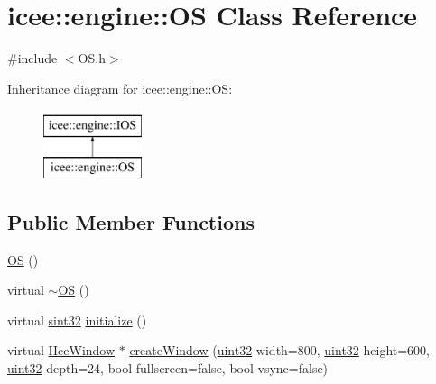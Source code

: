 \hypertarget{classicee_1_1engine_1_1OS}{
\section{icee::engine::OS Class Reference}
\label{classicee_1_1engine_1_1OS}
}


{\ttfamily \#include $<$OS.h$>$}

Inheritance diagram for icee::engine::OS:\begin{figure}[H]
\begin{center}
\leavevmode
\includegraphics[height=2.000000cm]{classicee_1_1engine_1_1OS}
\end{center}
\end{figure}
\subsection*{Public Member Functions}
\begin{DoxyCompactItemize}
\item 
\hyperlink{classicee_1_1engine_1_1OS_ade94449836a8fce03cd44ed91c59e424}{OS} ()
\item 
virtual \hyperlink{classicee_1_1engine_1_1OS_a74ddb398eb3b33901a5294bbfa7f0fd2}{$\sim$OS} ()
\item 
virtual \hyperlink{namespacecompatibility_afc3ea6dfbdda98c9d2615b235b140a18}{sint32} \hyperlink{classicee_1_1engine_1_1OS_a42869381836268f3c27d610e43743da3}{initialize} ()
\item 
virtual \hyperlink{classicee_1_1engine_1_1IIceWindow}{IIceWindow} $\ast$ \hyperlink{classicee_1_1engine_1_1OS_a460645e9a18535546cecb2280cfe364e}{createWindow} (\hyperlink{namespacecompatibility_a51e8fe2956b4f39fe1fae96cec0d8393}{uint32} width=800, \hyperlink{namespacecompatibility_a51e8fe2956b4f39fe1fae96cec0d8393}{uint32} height=600, \hyperlink{namespacecompatibility_a51e8fe2956b4f39fe1fae96cec0d8393}{uint32} depth=24, bool fullscreen=false, bool vsync=false)
\end{DoxyCompactItemize}


